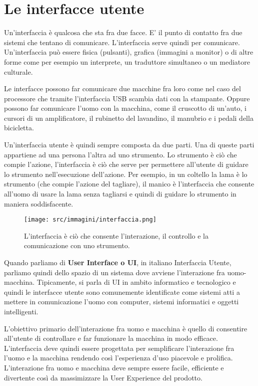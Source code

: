 
\chapter{Le interfacce utente}

Un'interfaccia è qualcosa che sta fra due facce. E' il punto di contatto fra due sistemi che tentano di comunicare. L'interfaccia serve quindi per comunicare. Un'interfaccia può essere fisica (pulsanti), grafica (immagini a monitor) o di altre forme come per esempio un interprete, un traduttore simultaneo o un mediatore culturale. 

Le interfacce possono far comunicare due macchine fra loro come nel caso del processore che tramite l'interfaccia USB scambia dati con la stampante. Oppure possono far comunicare l’uomo con la macchina, come il cruscotto di un’auto, i cursori di un amplificatore, il rubinetto del lavandino, il manubrio e i pedali della bicicletta.

Un'interfaccia utente è quindi sempre composta da due parti. Una di queste parti appartiene ad una persona l'altra ad uno strumento. Lo strumento è ciò che compie l'azione, l’interfaccia è ciò che serve per permettere all'utente di guidare lo strumento nell'esecuzione dell'azione. Per esempio, in un coltello la lama è lo strumento (che compie l'azione del tagliare), il manico è l’interfaccia che consente all'uomo di usare la lama senza tagliarsi e quindi di guidare lo strumento in maniera soddisfacente. 

\begin{figure}[!h]
	\centering
	\texttt{[image: src/immagini/interfaccia.png]}
	\caption{L'interfaccia è ciò che consente l'interazione, il controllo e la comunicazione con uno strumento.}
\end{figure}


Quando parliamo di \textbf{User Interface o UI}, in italiano Interfaccia Utente, parliamo quindi dello spazio di un sistema dove avviene l'interazione fra uomo-macchina. Tipicamente, si parla di UI in ambito informatico e tecnologico e quindi le interfacce utente sono comunemente identificate come sistemi atti a mettere in comunicazione l'uomo con computer, sistemi informatici e oggetti intelligenti.

L'obiettivo primario dell'interazione fra uomo e macchina è quello di consentire all'utente di controllare e far funzionare la macchina in modo efficace. L'interfaccia deve quindi essere progettata per semplificare l'interazione fra l'uomo e la macchina rendendo così l'esperienza d'uso piacevole e prolifica. L'interazione fra uomo e macchina deve sempre essere facile, efficiente e divertente così da massimizzare la User Experience del prodotto.

